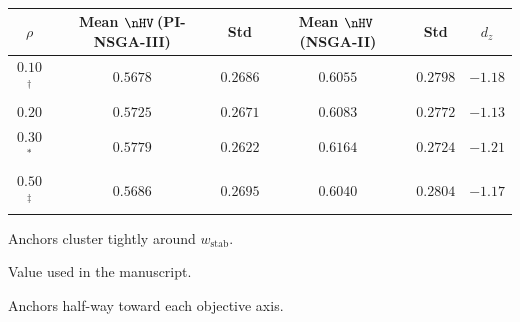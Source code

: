 \begin{table}[ht]
\centering
\caption{}
\label{tab:rho_ablation}
\small
\begin{tabular}{c cc cc c}
\toprule
$\rho$ & Mean $\nHV$\,(PI-NSGA-III) & Std & Mean $\nHV$\,(NSGA-II) & Std & $d_z$ \\
\midrule
$0.10$$^{\dagger}$ & $0.5678$ & $0.2686$ & $0.6055$ & $0.2798$ & $-1.18$ \\
$0.20$ & $0.5725$ & $0.2671$ & $0.6083$ & $0.2772$ & $-1.13$ \\
$0.30$$^{*}$ & $\mathbf{0.5779}$ & $0.2622$ & $0.6164$ & $0.2724$ & $\mathbf{-1.21}$ \\
$0.50$$^{\ddagger}$ & $0.5686$ & $0.2695$ & $0.6040$ & $0.2804$ & $-1.17$ \\
\bottomrule
\end{tabular}
\begin{tablenotes}[flushleft]\footnotesize
  \item[$^{\dagger}$] Anchors cluster tightly around $w_{\mathrm{stab}}$.
  \item[$^{*}$] Value used in the manuscript.
  \item[$^{\ddagger}$] Anchors half-way toward each objective axis.
\end{tablenotes}
\end{table}